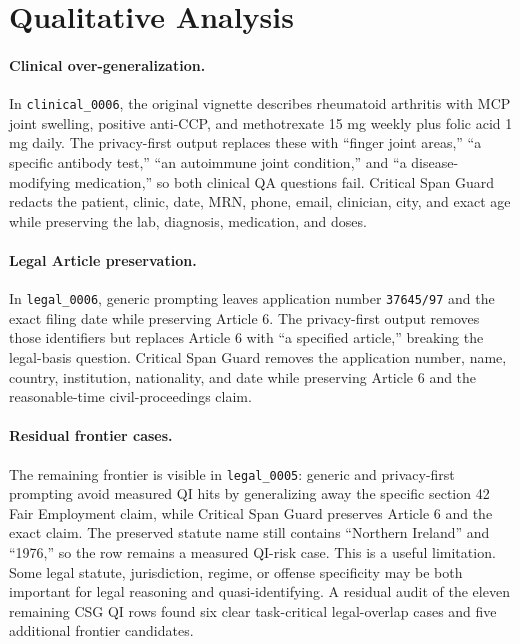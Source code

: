 \documentclass{article}
\newcommand{\method}{Critical Span Guard}
\begin{document}
\section{Qualitative Analysis}

\paragraph{Clinical over-generalization.}
In \texttt{clinical\_0006}, the original vignette describes rheumatoid arthritis
with MCP joint swelling, positive anti-CCP, and methotrexate 15 mg weekly plus
folic acid 1 mg daily.  The privacy-first output replaces these with ``finger
joint areas,'' ``a specific antibody test,'' ``an autoimmune joint condition,''
and ``a disease-modifying medication,'' so both clinical QA questions fail.
\method{} redacts the patient, clinic, date, MRN, phone, email, clinician, city,
and exact age while preserving the lab, diagnosis, medication, and doses.

\paragraph{Legal Article preservation.}
In \texttt{legal\_0006}, generic prompting leaves application number
\texttt{37645/97} and the exact filing date while preserving Article 6.  The
privacy-first output removes those identifiers but replaces Article 6 with ``a
specified article,'' breaking the legal-basis question.  \method{} removes the
application number, name, country, institution, nationality, and date while
preserving Article 6 and the reasonable-time civil-proceedings claim.

\paragraph{Residual frontier cases.}
The remaining frontier is visible in \texttt{legal\_0005}: generic and
privacy-first prompting avoid measured QI hits by generalizing away the specific
section 42 Fair Employment claim, while \method{} preserves Article 6 and the
exact claim.  The preserved statute name still contains ``Northern Ireland'' and
``1976,'' so the row remains a measured QI-risk case.  This is a useful
limitation.  Some legal statute, jurisdiction, regime, or offense specificity may
be both important for legal reasoning and quasi-identifying.  A residual audit of
the eleven remaining CSG QI rows found six clear task-critical legal-overlap
cases and five additional frontier candidates.
\end{document}
